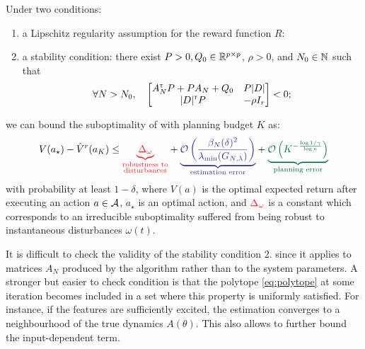 \documentclass{article}
\begin{document}
\begin{theorem}
	\label{thm:minimax-regret-bound}
		Under two conditions:
		\begin{enumerate}
			\item a Lipschitz regularity assumption for the reward function $R$:
			\item a stability condition: there exist $P>0,Q_0\in\mathbb{R}^{p\times p}$, $\rho>0$, and $N_0\in\mathbb{N}$ such that
			$$\forall N>N_0,\quad \begin{bmatrix}
			A_N^{\mathsf{\scriptscriptstyle T}} P + P A_N + Q_0 & P|D|  \\
			|D|^{\mathsf{\scriptscriptstyle T}} P & -\rho I_r \\
			\end{bmatrix}< 0;$$
		\end{enumerate}
		we can bound the suboptimality of  with planning budget $K$ as:
		\begin{equation*}
		V(a_\star) - \hat{V}^r(a_K) \leq  \hlr{\underbrace{\Delta_\omega}_{\substack{\text{robustness to}\\ \text{disturbances}}}} + \hlb{\underbrace{\cO\left(\frac{\beta_N(\delta)^2}{\lambda_{\min}(G_{N,\lambda})}\right)}_{\text{estimation error}}} + \hlg{\underbrace{\cO\left(K^{-\frac{\log 1/\gamma}{\log \kappa}}\right)}_{\text{planning error}}} 
		\end{equation*}
		with probability at least $1-\delta$, where $V(a)$ is the optimal expected return after executing an action $a\in\mathcal{A}$, $a_\star$ is an optimal action, and $\hlr{\Delta_\omega}$ is a constant which corresponds to an irreducible suboptimality suffered from being robust to instantaneous disturbances $\omega(t)$.
\end{theorem}

It is difficult to check the validity of the stability condition 2. since it applies to matrices $A_N$ produced by the algorithm rather than to the system parameters. A stronger but easier to check condition is that the polytope \eqref{eq:polytope} at some iteration becomes included in a set where this property is uniformly satisfied. For instance, if the features are sufficiently excited, the estimation converges to a neighbourhood of the true dynamics $A(\theta)$. This also allows to further bound the input-dependent  term.
\end{document}
